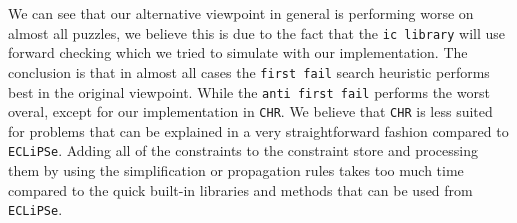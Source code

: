 We can see that our alternative viewpoint in general is performing worse on almost all puzzles, we believe this is due to the fact that the \texttt{ic library} will use forward checking which we tried to simulate with our implementation.
The conclusion is that in almost all cases the \texttt{first fail} search heuristic performs best in the original viewpoint. While the \texttt{anti first fail} performs the worst overal, except for our implementation in \texttt{CHR}.
We believe that \texttt{CHR} is less suited for problems that can be explained in a very straightforward fashion compared to \texttt{ECLiPSe}.
Adding all of the constraints to the constraint store and processing them by using the simplification or propagation rules takes too much time compared to the quick built-in libraries and methods that can be used from \texttt{ECLiPSe}.
 